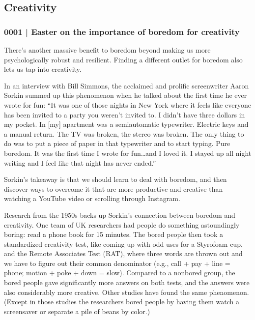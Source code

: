 	\subsection{Creativity} %
		\label{GM-LIFE-CREATIVITY}
		
		\subsubsection{0001 | Easter on the importance of boredom for creativity}
			\label{GM-LIFE-CREATIVITY-0001}
			
			There's another massive benefit to boredom beyond making us more psychologically robust and resilient. Finding a different outlet for boredom also lets us tap into creativity. 

			In an interview with Bill Simmons, the acclaimed and prolific screenwriter Aaron Sorkin summed up this phenomenon when he talked about the first time he ever wrote for fun: ``It was one of those nights in New York where it feels like everyone has been invited to a party you weren't invited to. I didn't have three dollars in my pocket. In [my] apartment was a semiautomatic typewriter. Electric keys and a manual return. The TV was broken, the stereo was broken. The only thing to do was to put a piece of paper in that typewriter and to start typing. Pure boredom. It was the first time I wrote for fun…and I loved it. I stayed up all night writing and I feel like that night has never ended.'' 

			Sorkin's takeaway is that we should learn to deal with boredom, and then discover ways to overcome it that are more productive and creative than watching a YouTube video or scrolling through Instagram. 

			Research from the 1950s backs up Sorkin's connection between boredom and creativity. One team of UK researchers had people do something astoundingly boring: read a phone book for 15 minutes. The bored people then took a standardized creativity test, like coming up with odd uses for a Styrofoam cup, and the Remote Associates Test (RAT), where three words are thrown out and we have to figure out their common denominator (e.g., call + pay + line = phone; motion + poke + down = slow). Compared to a nonbored group, the bored people gave significantly more answers on both tests, and the answers were also considerably more creative. Other studies have found the same phenomenon. (Except in those studies the researchers bored people by having them watch a screensaver or separate a pile of beans by color.) 

